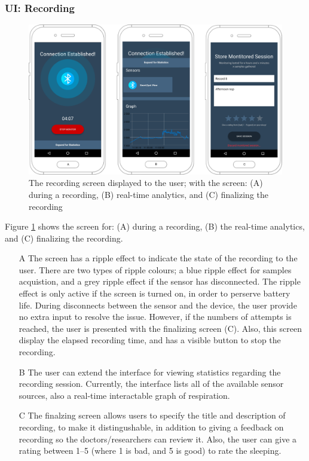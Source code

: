 \subsubsection{UI: Recording}
\begin{figure}
    \centering
    \includegraphics[scale=0.26]{images/Recording_img.pdf}
    \caption{The recording screen displayed to the user; with the screen: (A) during a recording, (B) real-time analytics, and (C) finalizing the recording}
    \label{fig:screen_recording}
\end{figure}

Figure \ref{fig:screen_recording} shows the screen for: (A) during a recording, (B) the real-time analytics, and (C) finalizing the recording. 

\begin{itemize}
    \item[A] The screen has a ripple effect to indicate the state of the recording to the user. There are two types of ripple colours; a blue ripple effect for samples acquistion, and a grey ripple effect if the sensor has disconnected. The ripple effect is only active if the screen is turned on, in order to perserve battery life. During disconnects between the sensor and the device, the user provide no extra input to resolve the issue. However, if the numbers of attempts is reached, the user is presented with the finalizing screen (C). Also, this screen display the elapsed recording time, and has a visible button to stop the recording. 
    \item[B] The user can extend the interface for viewing statistics regarding the recording session. Currently, the interface lists all of the available sensor sources, also a real-time interactable graph of respiration.
    \item[C] The finalzing screen allows users to specify the title and description of recording, to make it distingushable, in addition to giving a feedback on recording so the doctors/researchers can review it. Also, the user can give a rating between 1--5 (where 1 is bad, and 5 is good) to rate the sleeping.

\end{itemize}

